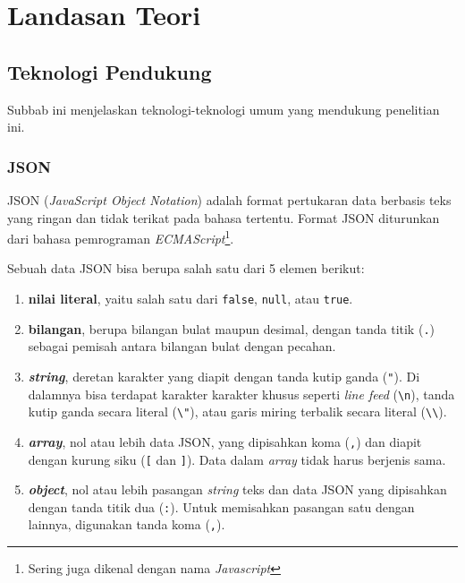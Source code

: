 \chapter{Landasan Teori}
\label{chap:pendahuluan}

\section{Teknologi Pendukung}
\label{sec:teknologi_pendukung}

Subbab ini menjelaskan teknologi-teknologi umum yang mendukung penelitian ini.

\subsection{JSON\cite{rfc7159}}

JSON (\textit{JavaScript Object Notation}) adalah format pertukaran data berbasis teks yang ringan dan tidak terikat pada bahasa tertentu. Format JSON diturunkan dari bahasa pemrograman \textit{ECMAScript}\footnote{Sering juga dikenal dengan nama \textit{Javascript}}.

Sebuah data JSON bisa berupa salah satu dari 5 elemen berikut:

\begin{enumerate}
	\item \textbf{nilai literal}, yaitu salah satu dari \texttt{false}, \texttt{null}, atau \texttt{true}.
	\item \textbf{bilangan}, berupa bilangan bulat maupun desimal, dengan tanda titik (\texttt{.}) sebagai pemisah antara bilangan bulat dengan pecahan.
	\item \textbf{\textit{string}}, deretan karakter yang diapit dengan tanda kutip ganda (\verb/"/). Di dalamnya bisa terdapat karakter karakter khusus seperti \textit{line feed} (\verb/\n/), tanda kutip ganda secara literal (\verb/\"/), atau garis miring terbalik secara literal (\verb/\\/).
	\item \textbf{\textit{array}}, nol atau lebih data JSON, yang dipisahkan koma (\verb/,/) dan diapit dengan kurung siku (\verb/[/ dan \verb/]/). Data dalam \textit{array} tidak harus berjenis sama.
	\item \textbf{\textit{object}}, nol atau lebih pasangan \textit{string} teks dan data JSON yang dipisahkan dengan tanda titik dua (\verb/:/). Untuk memisahkan pasangan satu dengan lainnya, digunakan tanda koma (\verb/,/).
\end{enumerate}

